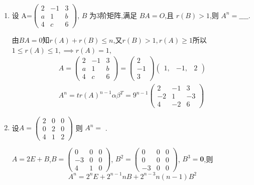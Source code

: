 \documentclass[12pt, a4paper, oneside, UTF8]{ctexbook}
\begin{document}
\begin{enumerate}[label=\arabic*.]
    \item 设 A=$\left(\begin{array}{rrr}
        2&-1&3\\
        a&1&b\\
        4&c&6
    \end{array}\right)$,
        $ B $ 为3阶矩阵,满足 $ BA = O $,且 $ r(B) > 1 $,则 $ A^n =\_\_\_\_$.
    \begin{solution}
    由$BA=0$知$r(A)+r(B)\leq n$,又$r(B)>1,r(A)\geq 1$所以$1\leq r(A)\leq 1,\implies r(A)=1$,
    \begin{align*}
        A=\left(\begin{array}{rrr}
        2&-1&3\\
        a&1&b\\
        4&c&6
    \end{array}\right)=\begin{pmatrix}
        2\\
        -1\\
        3
    \end{pmatrix}\begin{pmatrix}
        1,&-1,&2
    \end{pmatrix} \\
    A^n=tr(A)^{n-1}\alpha\beta^{T}=9^{n-1}\begin{pmatrix}
        2& -1& 3\\
        -2& 1& -3\\
        4& -2& 6
    \end{pmatrix}
    \end{align*}
    \end{solution}
    \item 设$
    A = \begin{pmatrix}
    2 & 0 & 0 \\
    0 & 2 & 0 \\
    4 & 1&  2
    \end{pmatrix}$
    则 $ A^n = $ \underline{\hspace{3cm}}.
    
    \begin{solution}
    $A=2E+B$,$B=\begin{pmatrix}
        0& 0& 0\\
        -3& 0& 0\\
        4& 1& 0
    \end{pmatrix}$, $B^2=\begin{pmatrix}
        0& 0& 0\\
        0& 0& 0\\
        -3& 0& 0
    \end{pmatrix}$, $B^3=\mathbf{0}$,则
    \[
    A^n=2^nE+2^{n-1}nB+2^{n-3}n(n-1)B^2
    \]
    \end{solution}
    

\end{enumerate}
\end{document}
